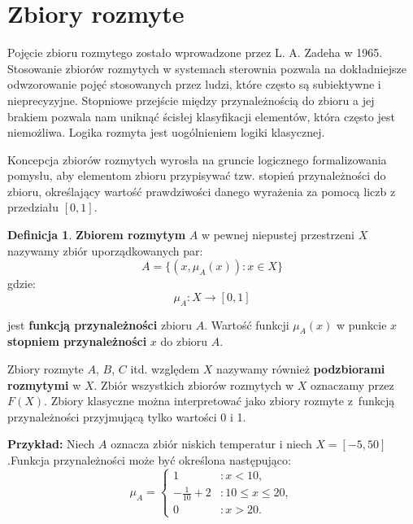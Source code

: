 \documentclass[a4paper,12pt]{article}
\theoremstyle{definition}
\newtheorem{df}{Definicja}
\begin{document}

\section{Zbiory rozmyte}
Pojęcie zbioru rozmytego zostało wprowadzone przez L. A. Zadeha w 1965. Stosowanie zbiorów rozmytych w systemach sterownia pozwala na dokładniejsze odwzorowanie pojęć stosowanych przez ludzi, które często są subiektywne i nieprecyzyjne. Stopniowe przejście między przynależnością do zbioru a jej brakiem pozwala nam uniknąć ścisłej klasyfikacji elementów, która często jest niemożliwa. Logika rozmyta jest uogólnieniem logiki klasycznej. 

Koncepcja zbiorów rozmytych wyrosła na gruncie logicznego formalizowania pomysłu, aby elementom zbioru przypisywać tzw. stopień przynależności do zbioru, określający wartość prawdziwości danego wyrażenia za pomocą liczb z przedziału $[0,1]$. 

\begin{df}
\textbf{Zbiorem rozmytym} $A$ w pewnej niepustej przestrzeni $X$ nazywamy zbiór uporządkowanych par:
\begin{equation}
    A = \{ (x, \mu_A (x))\colon x \in X \}
\end{equation}
gdzie:
\begin{equation}
   \mu_A \colon X \rightarrow [0,1]
\end{equation}

jest \textbf{funkcją przynależności} zbioru $A$.
Wartość funkcji $\mu_A (x)$ w punkcie $x$ \textbf{stopniem przynależności} $x$ do zbioru $A$.
\end{df}


Zbiory rozmyte $A$, $B$, $C$ itd. względem $X$ nazywamy również \textbf{podzbiorami rozmytymi} w $X$.
Zbiór wszystkich zbiorów rozmytych w $X$ oznaczamy przez $F(X)$. Zbiory klasyczne można interpretować jako zbiory rozmyte z~funkcją przynależności przyjmującą tylko wartości 0 i 1.

\medskip
\noindent
{\bf Przykład:} Niech $A$ oznacza zbiór niskich temperatur i niech $X = [-5, 50]$.Funkcja przynależności może być określona następująco:
\begin{equation}
    \mu_A = 
    \left\{\begin{array}{ll}
 		1 & \colon  x<10,\\
 		-\frac{1}{10} +2  &\colon 10 \leqslant x \leqslant 20,\\
		 0 & \colon x>20.
	 \end{array}\right.
\end{equation}
\end{document}
